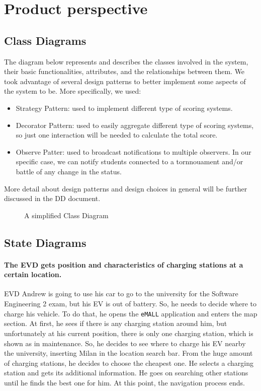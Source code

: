 \section{Product perspective}
\label{sec:product_perspective}%

\subsection{Class Diagrams}
\label{subsec:class_diagrams}%
The diagram below represents and describes the classes involved in the system, their basic functionalities, attributes,
and the relationships between them.
We took advantage of several design patterns to better implement some aspects of the system to be. More specifically, we used:
\begin{itemize}
    \item Strategy Pattern: used to implement different type of scoring systems.
    \item Decorator Pattern: used to easily aggregate different type of scoring systems,
    so just one interaction will be needed to calculate the total score.
    \item Observe Patter: used to broadcast notifications to multiple observers. In our specific case,
     we can notify students connected to a tornnouament and/or battle of any change in the status.
  \end{itemize}
More detail about design patterns and design choices in general will be further discussed in the DD document.
\begin{figure}[H]
    \begin{center}
        \caption{A simplified Class Diagram}
        \label{fig:class_diagram}%
    \end{center}
\end{figure}

\subsection{State Diagrams}
\label{subsec:state_diagrams}%

\paragraph{The EVD gets position and characteristics of charging stations at a certain location.}
EVD Andrew is going to use his car to go to the university for the Software Engineering 2 exam, but his EV is out of battery.
So, he needs to decide where to charge his vehicle.
To do that, he opens the \verb|eMALL| application and enters the map section.
At first, he sees if there is any charging station around him, but unfortunately at his current position,
there is only one charging station, which is shown as in maintenance.
So, he decides to see where to charge his EV nearby the university, inserting Milan in the location search bar.
From the huge amount of charging stations, he decides to choose the cheapest one.
He selects a charging station and gets its additional information.
He goes on searching other stations until he finds the best one for him.
At this point, the navigation process ends.

